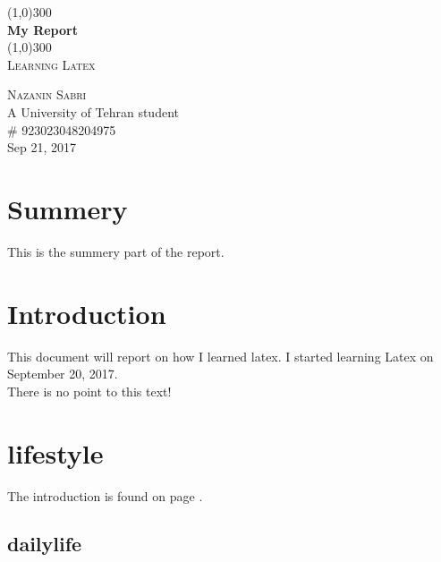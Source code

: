 \documentclass{article}
\begin{document}
\begin{titlepage}
	\begin{center}

	\line(1,0){300}\\
	[0.25in]
	\huge{\bfseries My Report}\\
	[2mm]
	\line(1,0){300}\\
	[0.75cm]
	\textsc{\large Learning Latex}\\
	[10cm]
	\end{center}

	\begin{flushright}
	\textsc{\large Nazanin Sabri\\}
	A University of Tehran student\\
	\# 923023048204975\\
	Sep 21, 2017
	\end{flushright}

\end{titlepage}


\section*{Summery}
This is the summery part of the report. 
\cleardoublepage


\tableofcontents
\thispagestyle{empty}
\cleardoublepage

\setcounter{page}{1}

\section{Introduction}\label{sec:intro}
This document will report on how I learned latex. I started learning Latex on September 20, 2017.\\ There is no point to this text!\\
\lipsum[1]

\newpage
\section{lifestyle}\label{sec:lifestyle}
The introduction is found on page \pageref{sec:intro}.


\lipsum[2]
\subsection{dailylife}
\lipsum[1]
\end{document}
